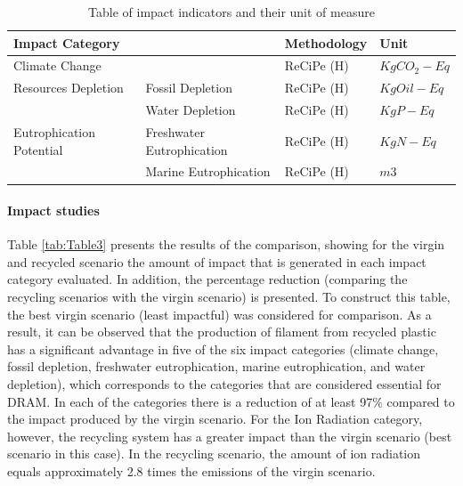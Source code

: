 \documentclass[12pt]{elsarticle} %
\begin{document}
\begin{footnotesize}
\begin{table}
\caption{ Table of impact indicators and their unit of measure}
\label{table2}
\centering
\begin{tabu} to 0.95\linewidth {X[0.5,l]  X[0.5,l] | X[1,l] | X[0.5,l]}
\toprule
\textbf{Impact Category} & & \textbf{Methodology} & \textbf{Unit} \\
\midrule 

 Climate Change  & &    ReCiPe (H) &    $Kg CO_{2} -  Eq$ \\ \midrule

Resources Depletion & Fossil Depletion &    ReCiPe (H) &    $Kg Oil - Eq$ \\

&   Water Depletion &  ReCiPe (H) & $Kg P - Eq$ \\ \midrule

Eutrophication Potential &  Freshwater Eutrophication & ReCiPe (H) &    $Kg N - Eq$ \\
    & Marine Eutrophication &  ReCiPe (H)  &    $m3$ \\

\bottomrule 
\end{tabu}
\end{table}
\end{footnotesize}

\hypertarget{impact}{%
\paragraph{Impact studies}\label{impact}}

Table \ref{tab:Table3} presents the results of the comparison, showing for the virgin and recycled scenario the amount of impact that is generated in each impact category evaluated.
In addition, the percentage reduction (comparing the recycling scenarios with the virgin scenario) is presented.
To construct this table, the best virgin scenario (least impactful) was considered for comparison.
As a result, it can be observed that the production of filament from recycled plastic has a significant advantage in five of the six impact categories (climate change, fossil depletion, freshwater eutrophication, marine eutrophication, and water depletion), which corresponds to the categories that are considered essential for DRAM.
In each of the categories there is a reduction of at least 97\% compared to the impact produced by the virgin scenario.
For the Ion Radiation category, however, the recycling system has a greater impact than the virgin scenario (best scenario in this case).
In the recycling scenario, the amount of ion radiation equals approximately 2.8 times the emissions of the virgin scenario.
\end{document}
